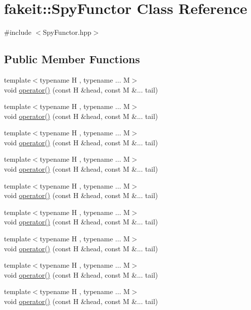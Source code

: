 \hypertarget{classfakeit_1_1SpyFunctor}{}\section{fakeit\+::Spy\+Functor Class Reference}
\label{classfakeit_1_1SpyFunctor}


{\ttfamily \#include $<$Spy\+Functor.\+hpp$>$}

\subsection*{Public Member Functions}
\begin{DoxyCompactItemize}
\item 
{\footnotesize template$<$typename H , typename ... M$>$ }\\void \mbox{\hyperlink{classfakeit_1_1SpyFunctor_aaac87a66aafadbf0ef8859114546ff9f}{operator()}} (const H \&head, const M \&... tail)
\item 
{\footnotesize template$<$typename H , typename ... M$>$ }\\void \mbox{\hyperlink{classfakeit_1_1SpyFunctor_aaac87a66aafadbf0ef8859114546ff9f}{operator()}} (const H \&head, const M \&... tail)
\item 
{\footnotesize template$<$typename H , typename ... M$>$ }\\void \mbox{\hyperlink{classfakeit_1_1SpyFunctor_aaac87a66aafadbf0ef8859114546ff9f}{operator()}} (const H \&head, const M \&... tail)
\item 
{\footnotesize template$<$typename H , typename ... M$>$ }\\void \mbox{\hyperlink{classfakeit_1_1SpyFunctor_aaac87a66aafadbf0ef8859114546ff9f}{operator()}} (const H \&head, const M \&... tail)
\item 
{\footnotesize template$<$typename H , typename ... M$>$ }\\void \mbox{\hyperlink{classfakeit_1_1SpyFunctor_aaac87a66aafadbf0ef8859114546ff9f}{operator()}} (const H \&head, const M \&... tail)
\item 
{\footnotesize template$<$typename H , typename ... M$>$ }\\void \mbox{\hyperlink{classfakeit_1_1SpyFunctor_aaac87a66aafadbf0ef8859114546ff9f}{operator()}} (const H \&head, const M \&... tail)
\item 
{\footnotesize template$<$typename H , typename ... M$>$ }\\void \mbox{\hyperlink{classfakeit_1_1SpyFunctor_aaac87a66aafadbf0ef8859114546ff9f}{operator()}} (const H \&head, const M \&... tail)
\item 
{\footnotesize template$<$typename H , typename ... M$>$ }\\void \mbox{\hyperlink{classfakeit_1_1SpyFunctor_aaac87a66aafadbf0ef8859114546ff9f}{operator()}} (const H \&head, const M \&... tail)
\item 
{\footnotesize template$<$typename H , typename ... M$>$ }\\void \mbox{\hyperlink{classfakeit_1_1SpyFunctor_aaac87a66aafadbf0ef8859114546ff9f}{operator()}} (const H \&head, const M \&... tail)
\end{DoxyCompactItemize}


